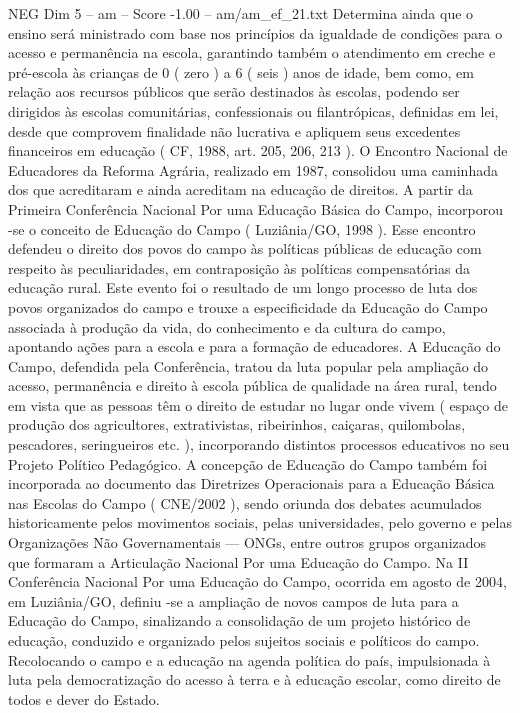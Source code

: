 \begin{textsample}{NEG Dim 5 – am – Score -1.00 – am/am\_ef\_21.txt}
Determina ainda que o ensino será ministrado com base nos princípios da igualdade de condições para o acesso e permanência na escola, garantindo também o atendimento em creche e pré-escola às crianças de 0 ( zero ) a 6 ( seis ) anos de idade, bem como, em relação aos recursos públicos que serão destinados às escolas, podendo ser dirigidos às escolas comunitárias, confessionais ou filantrópicas, definidas em lei, desde que comprovem finalidade não lucrativa e apliquem seus excedentes financeiros em educação ( CF, 1988, art. 205, 206, 213 ).
O Encontro Nacional de Educadores da Reforma Agrária, realizado em 1987, consolidou uma caminhada dos que acreditaram e ainda acreditam na educação de direitos.
A partir da Primeira Conferência Nacional Por uma Educação Básica do Campo, incorporou -se o conceito de Educação do Campo ( Luziânia/GO, 1998 ).
Esse encontro defendeu o direito dos povos do campo às políticas públicas de educação com respeito às peculiaridades, em contraposição às políticas compensatórias da educação rural.
Este evento foi o resultado de um longo processo de luta dos povos organizados do campo e trouxe a especificidade da Educação do Campo associada à produção da vida, do conhecimento e da cultura do campo, apontando ações para a escola e para a formação de educadores.
A Educação do Campo, defendida pela Conferência, tratou da luta popular pela ampliação do acesso, permanência e direito à escola pública de qualidade na área rural, tendo em vista que as pessoas têm o direito de estudar no lugar onde vivem ( espaço de produção dos agricultores, extrativistas, ribeirinhos, caiçaras, quilombolas, pescadores, seringueiros etc. ), incorporando distintos processos educativos no seu Projeto Político Pedagógico.
A concepção de Educação do Campo também foi incorporada ao documento das Diretrizes Operacionais para a Educação Básica nas Escolas do Campo ( CNE/2002 ), sendo oriunda dos debates acumulados historicamente pelos movimentos sociais, pelas universidades, pelo governo e pelas Organizações Não Governamentais — ONGs, entre outros grupos organizados que formaram a Articulação Nacional Por uma Educação do Campo.
Na II Conferência Nacional Por uma Educação do Campo, ocorrida em agosto de 2004, em Luziânia/GO, definiu -se a ampliação de novos campos de luta para a Educação do Campo, sinalizando a consolidação de um projeto histórico de educação, conduzido e organizado pelos sujeitos sociais e políticos do campo.
Recolocando o campo e a educação na agenda política do país, impulsionada à luta pela democratização do acesso à terra e à educação escolar, como direito de todos e dever do Estado.

\end{textsample}
